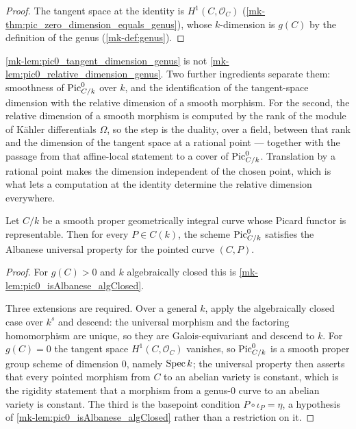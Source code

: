 \begin{proof}
  The tangent space at the identity is \(H^1(C,\mathcal O_C)\)
  (\ref{mk-thm:pic_zero_dimension_equals_genus}), whose \(k\)-dimension is \(g(C)\) by
  the definition of the genus (\ref{mk-def:genus}).
\end{proof}

\begin{remark}
  \label{mk-rem:tangent_versus_relative_dimension}
  \ref{mk-lem:pic0_tangent_dimension_genus} is not
  \ref{mk-lem:pic0_relative_dimension_genus}. Two further ingredients separate them:
  smoothness of \(\operatorname{Pic}^0_{C/k}\) over \(k\), and the identification of the
  tangent-space dimension with the relative dimension of a smooth morphism. For the
  second, the relative dimension of a smooth morphism is computed by the rank of the
  module of Kähler differentials \(\Omega\), so the step is the duality, over a field,
  between that rank and the dimension of the tangent space at a rational point ---
  together with the passage from that affine-local statement to a cover of
  \(\operatorname{Pic}^0_{C/k}\). Translation by a rational point makes the dimension independent of
  the chosen point, which is what lets a computation at the identity determine the
  relative dimension everywhere.
\end{remark}

\begin{lemma}
  \label{mk-lem:pic0_isAlbanese_all_points}

  Let \(C/k\) be a smooth proper geometrically integral curve whose Picard functor
  is representable. Then for every \(P\in C(k)\), the scheme \(\operatorname{Pic}^0_{C/k}\)
  satisfies the Albanese universal property for the pointed curve \((C,P)\).
\end{lemma}

\begin{proof}
  For \(g(C) > 0\) and \(k\) algebraically closed this is
  \ref{mk-lem:pic0_isAlbanese_algClosed}.

  Three extensions are required. Over a general \(k\), apply the algebraically
  closed case over \(k^s\) and descend: the universal morphism and the factoring
  homomorphism are unique, so they are Galois-equivariant and descend to \(k\).
  For \(g(C) = 0\) the tangent space \(H^1(C,\mathcal O_C)\) vanishes, so
  \(\operatorname{Pic}^0_{C/k}\) is a smooth proper group scheme of dimension \(0\), namely
  \(\operatorname{Spec} k\); the universal property then asserts that every pointed morphism
  from \(C\) to an abelian variety is constant, which is the rigidity statement
  that a morphism from a genus-\(0\) curve to an abelian variety is constant.
  The third is the basepoint condition \(P \circ \iota_P = \eta\), a hypothesis
  of \ref{mk-lem:pic0_isAlbanese_algClosed} rather than a restriction on it.
\end{proof}

